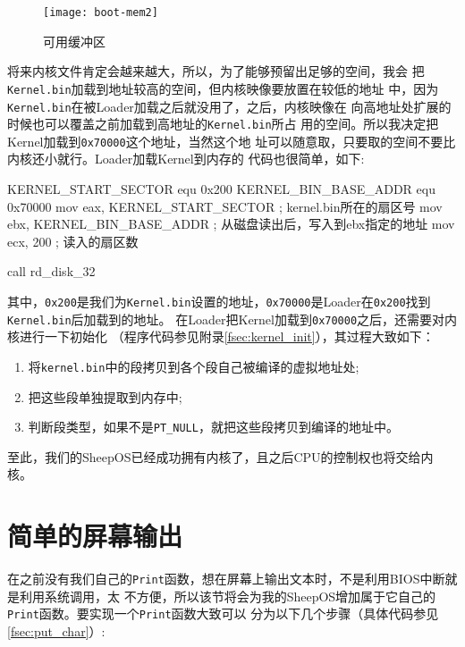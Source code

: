 \begin{figure}[H]
  \centering
  \texttt{[image: boot-mem2]}
  \caption{可用缓冲区}
  \label{fig:hc}
\end{figure}

将来内核文件肯定会越来越大，所以，为了能够预留出足够的空间，我会
把\texttt{Kernel.bin}加载到地址较高的空间，但内核映像要放置在较低的地址
中，因为\texttt{Kernel.bin}在被Loader加载之后就没用了，之后，内核映像在
向高地址处扩展的时候也可以覆盖之前加载到高地址的\texttt{Kernel.bin}所占
用的空间。所以我决定把Kernel加载到\texttt{0x70000}这个地址，当然这个地
址可以随意取，只要取的空间不要比内核还小就行\cite{DM2006}。Loader加载Kernel到内存的
代码也很简单，如下:

\begin{nasmcode}
   KERNEL_START_SECTOR equ 0x200
   KERNEL_BIN_BASE_ADDR equ 0x70000
   mov eax, KERNEL_START_SECTOR        ; kernel.bin所在的扇区号
   mov ebx, KERNEL_BIN_BASE_ADDR       ; 从磁盘读出后，写入到ebx指定的地址
   mov ecx, 200                ; 读入的扇区数

   call rd_disk_32
\end{nasmcode}

其中，\texttt{0x200}是我们为\texttt{Kernel.bin}设置的地址，\texttt{0x70000}是Loader在\texttt{0x200}找到\texttt{Kernel.bin}后加载到的地址。
在Loader把Kernel加载到\texttt{0x70000}之后，还需要对内核进行一下初始化
（程序代码参见附录\ref{fsec:kernel_init}），其过程大致如下：
\begin{enumerate}
\item 将\texttt{kernel.bin}中的段拷贝到各个段自己被编译的虚拟地址处;
\item 把这些段单独提取到内存中;
\item 判断段类型，如果不是\texttt{PT\_NULL}，就把这些段拷贝到编译的地址中。
\end{enumerate}
至此，我们的SheepOS已经成功拥有内核了，且之后CPU的控制权也将交给内核。

\section{简单的屏幕输出}

在之前没有我们自己的\texttt{Print}函数，想在屏幕上输出文本时，不是利用BIOS中断就是利用系统调用，太
不方便，所以该节将会为我的SheepOS增加属于它自己的\texttt{Print}函数。要实现一个\texttt{Print}函数大致可以
分为以下几个步骤（具体代码参见\ref{fsec:put_char}）:

